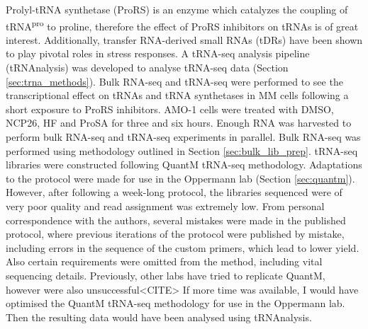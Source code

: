 Prolyl-tRNA synthetase (ProRS) is an enzyme which catalyzes the coupling of tRNA\textsuperscript{pro} to proline, therefore the effect of ProRS inhibitors on tRNAs is of great interest.
Additionally, transfer RNA-derived small RNAs (tDRs) have been shown to play pivotal roles in stress responses\cite{li2022distinct}.
A tRNA-seq analysis pipeline (tRNAnalysis) was developed to analyse tRNA-seq data (Section \ref{sec:trna_methods}).
Bulk RNA-seq and tRNA-seq were performed to see the transcriptional effect on tRNAs and tRNA synthetases in MM cells following a short exposure to ProRS inhibitors.
AMO-1 cells were treated with DMSO, NCP26, HF and ProSA for three and six hours.
Enough RNA was harvested to perform bulk RNA-seq and tRNA-seq experiments in parallel.
Bulk RNA-seq was performed using methodology outlined in Section \ref{sec:bulk_lib_prep}.
tRNA-seq libraries were constructed following QuantM tRNA-seq methodology\cite{pinkard2020quantitative}.
Adaptations to the protocol were made for use in the Oppermann lab (Section \ref{sec:quantm}).
However, after following a week-long protocol, the libraries sequenced were of very poor quality and read assignment was extremely low.
From personal correspondence with the authors, several mistakes were made in the published protocol, where previous iterations of the protocol were published by mistake, including errors in the sequence of the custom primers, which lead to lower yield.
Also certain requirements were omitted from the method, including vital sequencing details.
Previously, other labs have tried to replicate QuantM, however were also unsuccessful<CITE>
If more time was available, I would have optimised the QuantM tRNA-seq methodology for use in the Oppermann lab.
Then the resulting data would have been analysed using tRNAnalysis.


